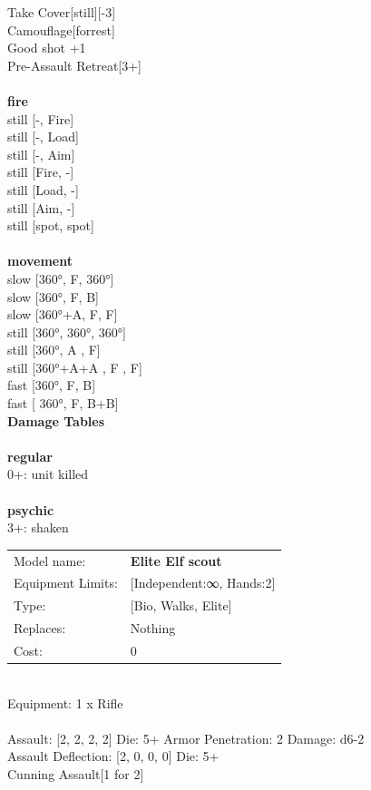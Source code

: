 \noindent Take Cover[still][-3]\\ 
Camouflage[forrest]\\ 
Good shot +1\\ 
Pre-Assault Retreat[3+]\\ 


\ \\ {\bf fire } \\
still [-, Fire] \\
still [-, Load] \\
still [-, Aim] \\
still [Fire, -] \\
still [Load, -] \\
still [Aim, -] \\
still [spot, spot] \\
\ \\ {\bf movement } \\
slow [360°, F, 360°] \\
slow [360°, F, B] \\
slow [360°+A, F, F] \\
still [360°, 360°, 360°] \\
still [360°, A , F] \\
still [360°+A+A , F , F] \\
fast [360°, F, B] \\
fast [ 360°,  F, B+B] \\


{\bf Damage Tables} \\
\ \\ {\bf regular } \\
0+: unit killed \\
\ \\ {\bf psychic } \\
3+: shaken \\


\noindent
\begin{tabular}{ll}
Model name: &{\bf Elite Elf scout } \\
Equipment Limits: &[Independent:∞, Hands:2] \\
Type: &[Bio, Walks, Elite] \\
Replaces: &Nothing \\
Cost: & 0\\
\end{tabular}
\ \\
Equipment: 1 x Rifle \\
\ \\
Assault: [2, 2, 2, 2] Die: 5+ Armor Penetration: 2 Damage: d6-2 \\
Assault Deflection: [2, 0, 0, 0] Die: 5+\\
\indent Cunning Assault[1 for 2]\\ 
 
